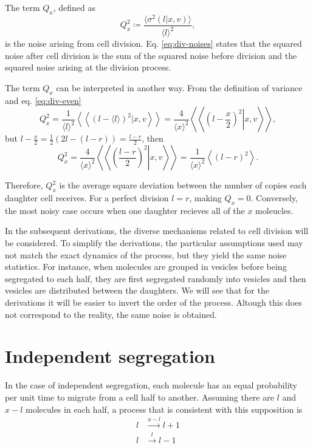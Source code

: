 The term $Q_x$, defined as
\begin{equation}
  \label{eq:div-Q}
  Q_x^2 \coloneqq \frac{\langle\sigma^2(l|x,v)\rangle}{\langle l\rangle^2},
\end{equation}
is the noise arising from cell division. Eq. \eqref{eq:div-noises} states that the squared noise after cell division is the sum of the squared noise before division and the squared noise arising at the division process.

The term $Q_x$ can be interpreted in another way. From the definition of variance and eq. \eqref{eq:div-even}
\begin{equation*}
  Q_x^2 = \frac{1}{\langle l\rangle^2}\left\langle\left\langle\left(l-\langle l\rangle\right)^2|x,v\right\rangle\right\rangle = \frac{4}{\langle x\rangle^2}\left\langle\left\langle\left.\left(l-\frac{x}{2}\right)^2\right|x,v\right\rangle\right\rangle,
\end{equation*}
but $l - \frac{x}{2} = \frac{1}{2}(2l-(l-r)) = \frac{l-r}{2}$, then
\begin{equation*}
   Q_x^2 = \frac{4}{\langle x\rangle^2}\left\langle\left\langle\left.\left(\frac{l-r}{2}\right)^2\right|x,v\right\rangle\right\rangle  = \frac{1}{\langle x\rangle^2}\left\langle\left(l-r\right)^2\right\rangle.
\end{equation*}

Therefore, $Q_x^2$ is the average square deviation between the number of copies each daughter cell receives. For a perfect division $l=r$, making $Q_x=0$. Conversely, the most noisy case occurs when one daughter recieves all of the $x$ moleucles.

In the subsequent derivations, the diverse mechanisms related to cell division will be considered. To simplify the derivations, the particular assumptions used may not match the exact dynamics of the process, but they yield the same noise statistics. For instance, when molecules are grouped in vesicles before being segregated to each half, they are first segregated randomly into vesicles and then vesicles are distributed between the daughters. We will see that for the derivations it will be easier to invert the order of the process. Altough this does not correspond to the reality, the same noise is obtained.

\section{Independent segregation}

In the case of independent segregation, each molecule has an equal probability per unit time to migrate from a cell half to another. Assuming there are $l$ and $x-l$ molecules in each half, a process that is consistent with this supposition is
\begin{equation}
  \label{eq:div-arr_ind}
  \begin{split}
    l&\xrightarrow{x-l}l+1\\
    l&\xrightarrow{l}l-1
  \end{split}
\end{equation}


